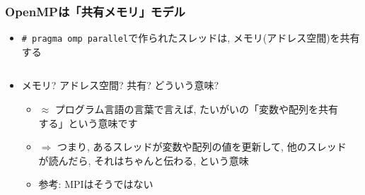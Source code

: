 \documentclass[10pt,dvipdfmx]{beamer}
\newcommand{\ao}[1]{{\color{blue}#1}}
\newcommand{\aka}[1]{{\color{red}#1}}
\begin{document}
\begin{frame}
\frametitle{OpenMPは「共有メモリ」モデル}
\begin{itemize}
\item \texttt{\# pragma omp parallel}で作られたスレッドは,
  \ao{メモリ(アドレス空間)を共有}する
\end{itemize}

\begin{columns}
  \begin{column}{0.6\textwidth}
    \begin{itemize}
    \item<2-> メモリ? アドレス空間? 共有? どういう意味?
      \begin{itemize}
      \item<3-> $\approx$ プログラム言語の言葉で言えば,
        \aka{たいがいの}「変数や配列を共有する」という意味です
      \item<4-> $\Rightarrow$ つまり, あるスレッドが変数や配列の値を更新して,
        他のスレッドが読んだら, それはちゃんと伝わる, という意味
      \item<5-> 参考: MPIはそうではない
      \end{itemize}
    \end{itemize}
  \end{column}
  \begin{column}{0.4\textwidth}
  \begin{center}
  \end{center}
  \end{column}
\end{columns}
\end{frame}
\end{document}

